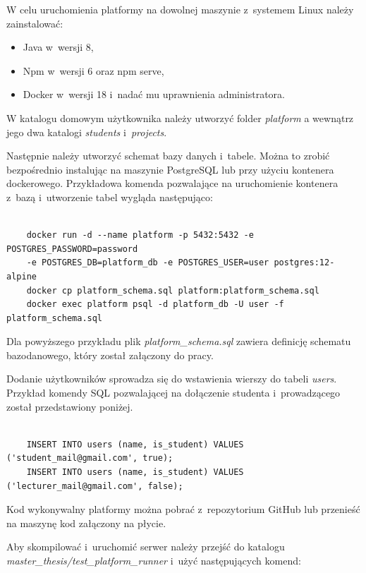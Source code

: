W celu uruchomienia platformy na dowolnej maszynie z~systemem Linux należy zainstalować:
\begin{itemize}
    \item Java w~wersji 8,
    \item Npm w~wersji 6 oraz npm serve,
    \item Docker w~wersji 18 i~nadać mu uprawnienia administratora.
\end{itemize}

W katalogu domowym użytkownika należy utworzyć folder \textit{platform} a wewnątrz jego dwa katalogi \textit{students} i~\textit{projects}.

Następnie należy utworzyć schemat bazy danych i~tabele.
Można to zrobić bezpośrednio instalując na maszynie PostgreSQL lub przy użyciu kontenera dockerowego.
Przykładowa komenda pozwalające na uruchomienie kontenera z~bazą i~utworzenie tabel wygląda następująco:

{\selectfont
\tiny
\begin{lstlisting}

    docker run -d --name platform -p 5432:5432 -e POSTGRES_PASSWORD=password
    -e POSTGRES_DB=platform_db -e POSTGRES_USER=user postgres:12-alpine
    docker cp platform_schema.sql platform:platform_schema.sql
    docker exec platform psql -d platform_db -U user -f platform_schema.sql

\end{lstlisting}
}

Dla powyższego przykładu plik \textit{platform\_schema.sql} zawiera definicję schematu bazodanowego, który został załączony do pracy.

Dodanie użytkowników sprowadza się do wstawienia wierszy do tabeli \textit{users}.
Przykład komendy SQL pozwalającej na dołączenie studenta i~prowadzącego został przedstawiony poniżej.

{\selectfont
\tiny
\begin{lstlisting}

    INSERT INTO users (name, is_student) VALUES ('student_mail@gmail.com', true);
    INSERT INTO users (name, is_student) VALUES ('lecturer_mail@gmail.com', false);

\end{lstlisting}
}

Kod wykonywalny platformy można pobrać z~repozytorium GitHub lub przenieść na maszynę kod załączony na płycie.

Aby skompilować i~uruchomić serwer należy przejść do katalogu \newline \textit{master\_thesis/test\_platform\_runner} i~użyć następujących komend:

